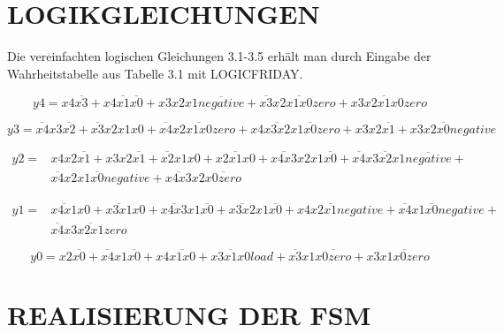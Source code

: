 \section{LOGIKGLEICHUNGEN}

Die vereinfachten logischen Gleichungen 3.1-3.5 erhält man durch Eingabe der Wahrheitstabelle aus Tabelle 3.1 mit LOGICFRIDAY.

\begin{equation}
y4 = x4\overline{x3} + x4\overline{x1}\overline{x0} + x3x2x1\overline{negative} + \overline{x3}x2\overline{x1x0}zero + x3\overline{x2x1x0}zero \label{3.1}
\end{equation}

\begin{equation}
  y3 = \overline{x4}x3 \overline{x2} + \overline{x3}x2x1x0 + \overline{x4}x2\overline{x1x0}zero + x4\overline{x3x2}x1\overline{x0}zero + x3x2\overline{x1} + x3x2\overline{x0}negative \label{3.2}
\end{equation}

\begin{equation}
	\begin{split}
  y2 = & x4x2\overline{x1} + x3x2\overline{x1} + \overline{x2}x1x0 + x2\overline{x1}x0 + \overline{x4x3}x2x1\overline{x0} + \overline{x4}x3\overline{x2}x1\overline{negative} + \\
       & \overline{x4}x2x1\overline{x0}negative + \overline{x4x3}x2\overline{x0zero} \label{3.3}
  \end{split}
\end{equation}

\begin{equation}
  \begin{split}
  y1 = & \overline{x4x1}x0 + \overline{x3x1}x0 + \overline{x4x3}x1\overline{x0} + \overline{x3x2}x1\overline{x0} + x4x2\overline{x1}negative + \overline{x4}x1\overline{x0}negative + \\
       & \overline{x4}x3\overline{x2x1}zero \label{3.4}
  \end{split}
\end{equation}

\begin{equation}
  y0 = x2\overline{x0} + \overline{x4}x1\overline{x0} + x4\overline{x1x0} + \overline{x3x1x0}load + \overline{x3}x1\overline{x0zero} + x3\overline{x1x0zero} \label{3.5}
\end{equation}

\section{REALISIERUNG DER FSM}

